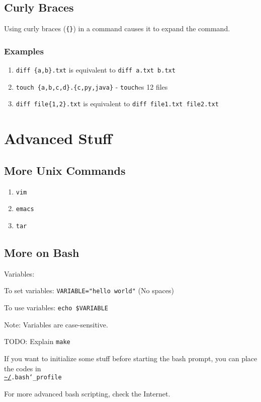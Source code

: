 \documentclass[12pt]{article}
\newcommand{\urlwofont}[1]{\urlstyle{same}\url{#1}}
\begin{document}
\subsection{Curly Braces}
Using curly braces (\texttt{\{\}}) in a command causes it to expand the command.

\subsubsection{Examples}
\begin{enumerate}
\item \texttt{diff \{a,b\}.txt} is equivalent to \texttt{diff a.txt b.txt}
\item \texttt{touch \{a,b,c,d\}.\{c,py,java\}} - \texttt{touch}es 12 files
\item \texttt{diff file\{1,2\}.txt} is equivalent to \texttt{diff file1.txt file2.txt}
\end{enumerate}

\newpage
\section{Advanced Stuff}
\subsection{More Unix Commands}
\begin{enumerate}

\item{\texttt{vim}}

\item{\texttt{emacs}}

\item{\texttt{tar}}
\end{enumerate}

\subsection{More on Bash}
Variables:

To set variables:
\texttt{VARIABLE="hello world"} (No spaces)

To use variables:
\texttt{echo \$VARIABLE}

Note: Variables are case-sensitive.

TODO: Explain \texttt{make}

If you want to initialize some stuff before starting the bash prompt, you can place the codes in \\ \texttt{\urlwofont{~/}.bash\char`_profile}



For more advanced bash scripting, check the Internet.
\end{document}
